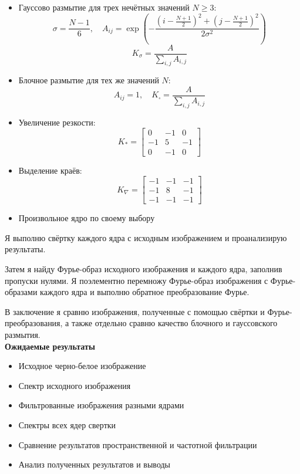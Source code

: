 \documentclass[a4paper,12pt]{article}
\begin{document}
\begin{itemize}
	\item Гауссово размытие для трех нечётных значений $N \geq 3$:
	\[
	\sigma = \frac{N - 1}{6}, \quad A_{ij} = \exp\left(-\frac{(i - \frac{N+1}{2})^2 + (j - \frac{N+1}{2})^2}{2\sigma^2}\right)
	\]
	\[
	K_\sigma = \frac{A}{\sum_{i,j} A_{i,j}}
	\]
	
	\item Блочное размытие для тех же значений $N$:
	\[
	A_{ij} = 1, \quad K_\square = \frac{A}{\sum_{i,j} A_{i,j}}
	\]
	
	\item Увеличение резкости:
	\[
	K_* = \begin{bmatrix}
	0 & -1 & 0 \\
	-1 & 5 & -1 \\
	0 & -1 & 0
	\end{bmatrix}
	\]
	
	\item Выделение краёв:
	\[
	K_\nabla = \begin{bmatrix}
	-1 & -1 & -1 \\
	-1 & 8 & -1 \\
	-1 & -1 & -1
	\end{bmatrix}
	\]
	
	\item Произвольное ядро по своему выбору
\end{itemize}

Я выполню свёртку каждого ядра с исходным изображением и проанализирую результаты.

Затем я найду Фурье-образ исходного изображения и каждого ядра, заполнив пропуски нулями. Я поэлементно перемножу Фурье-образ изображения с Фурье-образами каждого ядра и выполню обратное преобразование Фурье.

В заключение я сравню изображения, полученные с помощью свёртки и Фурье-преобразования, а также отдельно сравню качество блочного и гауссовского размытия.
\[\]
\textbf{Ожидаемые результаты}
\begin{itemize}
	\item Исходное черно-белое изображение
	\item Спектр исходного изображения
	\item Фильтрованные изображения разными ядрами
	\item Спектры всех ядер свертки
	\item Сравнение результатов пространственной и частотной фильтрации
	\item Анализ полученных результатов и выводы
\end{itemize}
\end{document}
